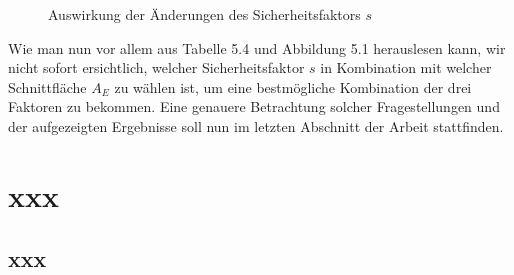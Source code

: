 \documentclass[a4paper, 10pt]{report}
\begin{document}
\begin{figure}[htb]
\caption{Auswirkung der Änderungen des Sicherheitsfaktors \( s \)} 
\end{figure} 

Wie man nun vor allem aus Tabelle 5.4 und Abbildung 5.1 herauslesen kann, wir nicht sofort ersichtlich, welcher Sicherheitsfaktor \( s \)  in Kombination mit welcher Schnittfläche \( A_E \) zu wählen ist, um eine bestmögliche Kombination der drei Faktoren zu bekommen. Eine genauere Betrachtung solcher Fragestellungen und der aufgezeigten Ergebnisse soll nun im letzten Abschnitt der Arbeit stattfinden.  


{}



\appendix
\chapter{xxx}
\section{xxx}
\end{document}
